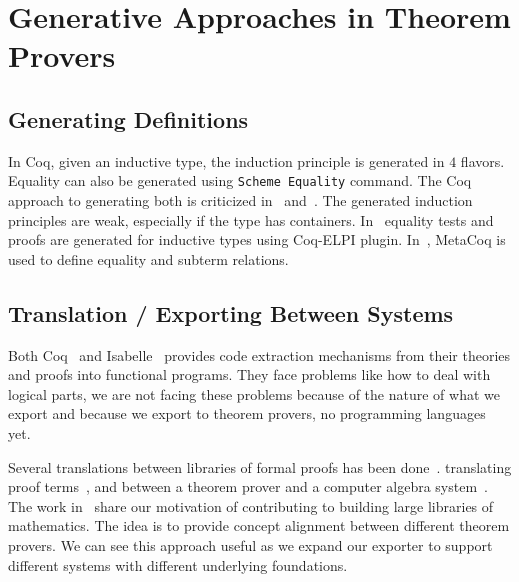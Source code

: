 \section{Generative Approaches in Theorem Provers}

\subsection{Generating Definitions}
In Coq, given an inductive type, the induction principle is generated in $4$ flavors. Equality can also be generated using \verb|Scheme Equality| command. The Coq approach to generating both is criticized in~\cite{coqDeriveEquality2019} and~\cite{coqDeriveSubterm2020}. The generated induction principles are weak, especially if the type has containers.  In~\cite{coqDeriveEquality2019} equality tests and proofs are generated for inductive types using Coq-ELPI plugin. In~\cite{coqDeriveSubterm2020}, MetaCoq is used to define equality and subterm relations. 

 

\subsection{Translation / Exporting Between Systems}
Both Coq~\cite{CoqCodegen2003, cruz2003program} and Isabelle~\cite{IsabelleCodegen2010} provides code extraction mechanisms from their theories and proofs into functional programs. They face problems like how to deal with logical parts, we are not facing these problems because of the nature of what we export and because we export to theorem provers, no programming languages yet. 

Several translations between libraries of formal proofs has been done~\cite{impsToOmdoc2018, mizarToIsabelle2018. iancu2013mizar}. translating proof terms~\cite{kaliszyk2019DeclProofTerms}, and between a theorem prover and a computer algebra system~\cite{Lewis_2017}. 
The work in~\cite{Muller2017alignment} share our motivation of contributing to building large libraries of mathematics. The idea is to provide concept alignment between different theorem provers. We can see this approach useful as we expand our exporter to support different systems with different underlying foundations.  

